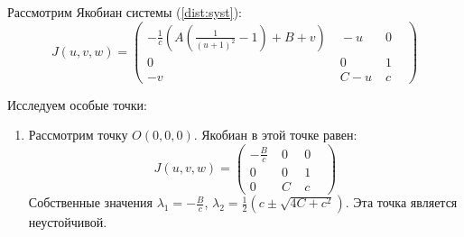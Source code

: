 \documentclass{article}
\begin{document}
Рассмотрим Якобиан системы (\ref{dist:syst}):
\begin{equation*}
J(u, v, w) = \begin{pmatrix} - \frac{1}{c} \left(A \left(\frac{1}{(u+1)^2} - 1 \right) + B + v \right)& \;  -u & \; 0 &\\ 0 &\; 0 & \; 1 & \\ -v & \; C - u & \; c &\end{pmatrix}
\end{equation*}

Исследуем особые точки:
\begin{enumerate}

\item Рассмотрим точку $O(0, 0, 0)$. Якобиан в этой точке равен:
\begin{equation*}
J(u, v, w) = \begin{pmatrix} - \frac{B}{c} & \;  0 & \; 0 &\\ 0 &\; 0 & \; 1 & \\ 0 & \; C & \; c &\end{pmatrix}
\end{equation*}
Собственные значения $\lambda_1 = -\frac{B}{c}$, $\lambda_2 = \frac{1}{2} \left( c \pm \sqrt{4 C + c^2} \right)$. Эта точка является неустойчивой.


\end{enumerate}
\end{document}
